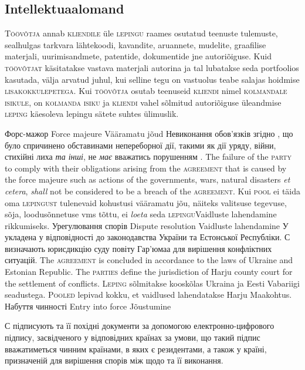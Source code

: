 \begin{Form}
\begin{paracol}{3}
{        \subsection{Intellektuaalomand}
        T\textsc{öövõtja} annab \textsc{kliendile} üle \textsc{lepingu} raames osutatud teenuste tulemuste, sealhulgas tarkvara lähtekoodi, kavandite, aruannete, mudelite, graafilise materjali, uurimisandmete, patentide, dokumentide jne autoriõiguse. Kuid \textsc{töövõtjat} käsitatakse vastava materjali autorina ja tal lubatakse seda portfoolios kasutada, välja arvatud juhul, kui selline tegu on vastuolus teabe salajas hoidmise \textsc{lisakokkulepetega}. Kui \textsc{töövõtja} osutab teenuseid \textsc{kliendi} nimel \textsc{kolmandale isikule}, on \textsc{kolmanda isiku} ja \textsc{kliendi} vahel sõlmitud autoriõiguse üleandmise \textsc{leping} käesoleva lepingu sätete suhtes ülimuslik.
        }
      \clause
        {Форс-мажор}
        {Force majeure}
        {Vääramatu jõud}
        {Невиконання  обов'язків згідно , що було спричинено обставинами непереборної дії, такими як дії уряду, війни, стихійні лиха \emph{та інші}, не \emph{має} вважатись порушенням .}
        {The failure of the \textsc{party} to comply with their obligations arising from the \textsc{agreement} that is caused by the force majeure such as actions of the governments, wars, natural disasters \emph{et cetera}, \emph{shall} not be considered to be a breach of the \textsc{agreement}.}
        {Kui \textsc{pool} ei täida oma \textsc{lepingust} tulenevaid kohustusi vääramatu jõu, näiteks valitsuse tegevuse, sõja, loodusõnnetuse vms tõttu, ei \emph{loeta} seda \textsc{lepingu}Vaidluste lahendamine rikkumiseks.}
      \clause
        {Урегулювання спорів}
        {Dispute resolution}
        {Vaidluste lahendamine}
        {У укладена у відповідності до законодавства України та Естонської Республіки. С визначають юрисдикцію суду повіту Гар'юмаа для вирішення конфліктних ситуацій.}
        {The \textsc{agreement} is concluded in accordance to the laws of Ukraine and Estonian Republic. The \textsc{parties} define the jurisdiction of Harju county court for the settlement of conflicts.}
        {L\textsc{eping} sõlmitakse kooskõlas Ukraina ja Eesti Vabariigi seadustega. P\textsc{ooled} lepivad kokku, et vaidlused lahendatakse Harju Maakohtus.}
      \clause
        {Набуття чинності}
        {Entry into force}
        {Jõustumine}
        {С підписують  та її похідні документи за допомогою електронно-цифрового підпису, засвідченого у відповідних країнах за умови, що такий підпис вважатиметься чинним країнами, в яких  є резидентами, а також у країні, призначеній для вирішення спорів між  щодо  та її виконання.

}
\end{paracol}
\end{Form}
